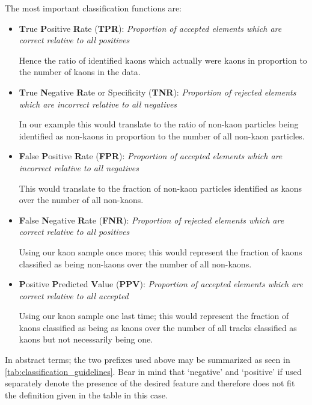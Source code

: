 The most important classification functions are:
\begin{itemize}
	\item \textbf{T}rue \textbf{P}ositive \textbf{R}ate (\textbf{TPR}): \textit{Proportion of accepted elements which are correct relative to all positives}

	\nobreak
	Hence the ratio of identified kaons which actually were kaons in proportion to the number of kaons in the data.

	\item \textbf{T}rue \textbf{N}egative \textbf{R}ate or Specificity (\textbf{TNR}): \textit{Proportion of rejected elements which are incorrect relative to all negatives}

	\nobreak
	In our example this would translate to the ratio of non-kaon particles being identified as non-kaons in proportion to the number of all non-kaon particles.

	\item \textbf{F}alse \textbf{P}ositive \textbf{R}ate (\textbf{FPR}): \textit{Proportion of accepted elements which are incorrect relative to all negatives}

	\nobreak
	This would translate to the fraction of non-kaon particles identified as kaons over the number of all non-kaons.

	\item \textbf{F}alse \textbf{N}egative \textbf{R}ate (\textbf{FNR}): \textit{Proportion of rejected elements which are correct relative to all positives}

	\nobreak
	Using our kaon sample once more; this would represent the fraction of kaons classified as being non-kaons over the number of all non-kaons.

	\item \textbf{P}ositive \textbf{P}redicted \textbf{V}alue (\textbf{PPV}): \textit{Proportion of accepted elements which are correct relative to all accepted}

	\nobreak
	Using our kaon sample one last time; this would represent the fraction of kaons classified as being as kaons over the number of all tracks classified as kaons but not necessarily being one.

\end{itemize}

In abstract terms; the two prefixes used above may be summarized as seen in \autoref{tab:classification_guidelines}. Bear in mind that `negative' and `positive' if used separately denote the presence of the desired feature and therefore does not fit the definition given in the table in this case.

